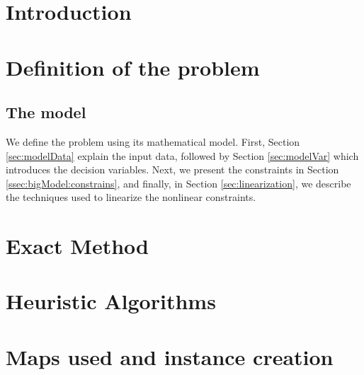 \documentclass[a4paper,12pt]{report}
\begin{document}
\afterpreface
\chapter{Introduction}




%
%
\chapter{Definition of the problem}
\section{The model}\label{sec:modelDescription}
We define the problem using its mathematical model.  
First, Section \ref{sec:modelData} explain the input data, followed by Section \ref{sec:modelVar} which introduces the decision variables.
Next, we present the constraints in Section \ref{ssec:bigModel:constrains}, and finally, in Section \ref{sec:linearization}, we describe the techniques used to linearize the nonlinear constraints.  





\chapter{Exact Method}\label{chap:ExactAlgo}


\chapter{Heuristic Algorithms}\label{chap:HeuristicAlgo}


\chapter{Maps used and instance creation}\label{sec:maps}


\end{document}
